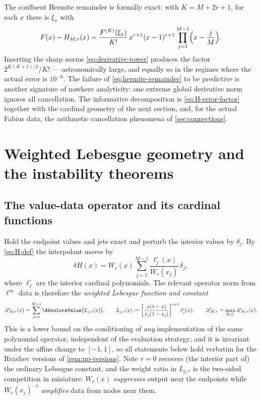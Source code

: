 The confluent Hermite remainder is formally exact: with
$K=M+2r+1$, for each $x$ there is $\xi_x$ with
\begin{equation}
 F(x)-H_{M,r}(x)
 =\frac{F^{(K)}(\xi_x)}{K!}\,
 x^{r+1}(x-1)^{r+1}\prod_{j=1}^{M-1}\Bigl(x-\frac jM\Bigr).
 \label{eq:hermite-remainder}
\end{equation}
Inserting the sharp norms \eqref{eq:derivative-tower} produces the
factor $2^{K(K+1)/2}/K!$ --- astronomically large, and equally so in
the regimes where the actual error is $10^{-6}$.  The failure of
\eqref{eq:hermite-remainder} to be predictive is another signature of
nowhere analyticity: one extreme global derivative norm ignores all
cancellation.  The informative decomposition is
\eqref{eq:H-error-factor} together with the cardinal geometry of the
next section, and, for the actual Fabius data, the arithmetic
cancellation phenomena of \cref{sec:connections}.

\section{Weighted Lebesgue geometry and the instability theorems}
\label{sec:conditioning}

\subsection{The value-data operator and its cardinal functions}

Hold the endpoint values and jets exact and perturb the interior
values by $\delta_j$.  By \eqref{eq:H-def} the interpolant moves by
\begin{equation}
 \delta H(x)=W_r(x)\sum_{j=1}^{M-1}
 \frac{\ell^{\circ}_j(x)}{W_r(x_j)}\,\delta_j,
 \label{eq:perturbation}
\end{equation}
where $\ell^{\circ}_j$ are the interior cardinal polynomials.  The
relevant operator norm from $\ell^\infty$ data is therefore the
\emph{weighted Lebesgue function and constant}
\begin{equation}
 \Leb_{M,r}(x)=\sum_{j=1}^{M-1}
 \AbsoluteValue{L_{j,r}(x)},
 \qquad
 L_{j,r}(x):=\left[\frac{x(1-x)}{x_j(1-x_j)}\right]^{r+1}
 \ell^{\circ}_j(x),
 \qquad
 \Leb_{M,r}=\max_{[0,1]}\Leb_{M,r}(x).
 \label{eq:weighted-lebesgue}
\end{equation}
This is a lower bound on the conditioning of \emph{any}
implementation of the same polynomial operator, independent of the
evaluation strategy; and it is invariant under the affine change to
$[-1,1]$, so all statements below hold verbatim for the Rvachev
versions of \cref{rem:up-versions}.  Note $r=0$ recovers (the
interior part of) the ordinary Lebesgue constant, and the weight
ratio in $L_{j,r}$ is the two-sided competition in miniature:
$W_r(x)$ \emph{suppresses} output near the endpoints while
$W_r(x_j)^{-1}$ \emph{amplifies} data from nodes near them.


